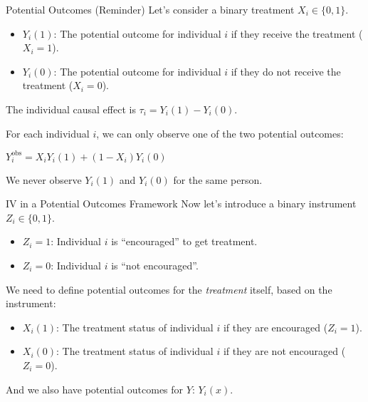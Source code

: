 \documentclass[
  ignorenonframetext,
  aspectratio=169]{beamer}
\providecommand{\tightlist}{%
  \setlength{\itemsep}{0pt}\setlength{\parskip}{0pt}}
\begin{document}
\begin{frame}{Potential Outcomes (Reminder)}
\label{potential-outcomes-reminder}
Let's consider a binary treatment \(X_i \in \{0, 1\}\).

\begin{itemize}
    \item $Y_i(1)$: The potential outcome for individual $i$ if they receive the treatment ($X_i=1$).
    \item $Y_i(0)$: The potential outcome for individual $i$ if they do not receive the treatment ($X_i=0$).
\end{itemize}

The individual causal effect is \(\tau_i = Y_i(1) - Y_i(0)\).

For each individual \(i\), we can only observe one of the two potential
outcomes:

\(Y_i^{\text{obs}} = X_i Y_i(1) + (1-X_i) Y_i(0)\)

We never observe \(Y_i(1)\) and \(Y_i(0)\) for the same person.
\end{frame}

\begin{frame}{IV in a Potential Outcomes Framework}
\label{iv-in-a-potential-outcomes-framework}
Now let's introduce a binary instrument \(Z_i \in \{0, 1\}\).

\begin{itemize}
\tightlist
\item
  \(Z_i=1\): Individual \(i\) is ``encouraged'' to get treatment.
\item
  \(Z_i=0\): Individual \(i\) is ``not encouraged''.
\end{itemize}

We need to define potential outcomes for the \textit{treatment} itself,
based on the instrument:

\begin{itemize}
\tightlist
\item
  \(X_i(1)\): The treatment status of individual \(i\) if they are
  encouraged (\(Z_i=1\)).
\item
  \(X_i(0)\): The treatment status of individual \(i\) if they are not
  encouraged (\(Z_i=0\)).
\end{itemize}

And we also have potential outcomes for \(Y\): \(Y_i(x)\).
\end{frame}
\end{document}

